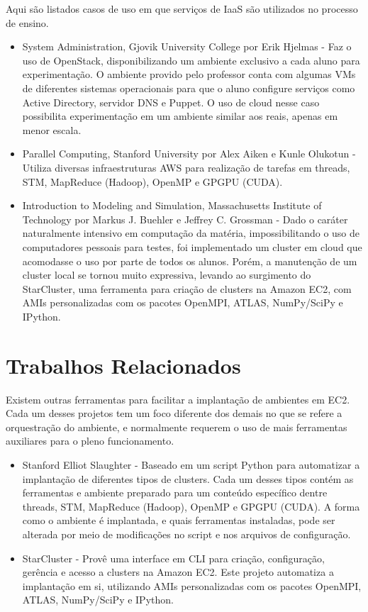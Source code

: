 \documentclass[tg]{mdtufsm}
\begin{document}
Aqui são listados casos de uso em que serviços de IaaS são utilizados no processo de ensino.

\begin{itemize}
\item System Administration, Gjovik University College por Erik Hjelmas \cite{erik} - Faz o uso de OpenStack, disponibilizando um ambiente exclusivo a cada aluno para experimentação. O ambiente provido pelo professor conta com algumas VMs de diferentes sistemas operacionais para que o aluno configure serviços como Active Directory, servidor DNS e Puppet. O uso de cloud nesse caso possibilita experimentação em um ambiente similar aos reais, apenas em menor escala.

\item Parallel Computing, Stanford University por Alex Aiken e Kunle Olukotun \cite{stanford} - Utiliza diversas infraestruturas AWS para realização de tarefas em threads, STM, MapReduce (Hadoop), OpenMP e GPGPU (CUDA).

\item Introduction to Modeling and Simulation, Massachusetts Institute of Technology por Markus J. Buehler e Jeffrey C. Grossman  \cite{starclusterMIT} - Dado o caráter naturalmente intensivo em computação da matéria, impossibilitando o uso de computadores pessoais para testes, foi implementado um cluster em cloud que acomodasse o uso por parte de todos os alunos. Porém, a manutenção de um cluster local se tornou muito expressiva, levando ao surgimento do StarCluster, uma ferramenta para criação de clusters na Amazon EC2, com AMIs personalizadas com os pacotes OpenMPI, ATLAS, NumPy/SciPy e IPython.
\end{itemize}


\section{Trabalhos Relacionados}

Existem outras ferramentas para facilitar a implantação de ambientes em EC2. Cada um desses projetos tem um foco diferente dos demais no que se refere a orquestração do ambiente, e normalmente requerem o uso de mais ferramentas auxiliares para o pleno funcionamento.

\begin{itemize}
	\item Stanford Elliot Slaughter - Baseado em um script Python para automatizar a implantação de diferentes tipos de clusters. Cada um desses tipos contém as ferramentas e ambiente preparado para um conteúdo específico dentre threads, STM, MapReduce (Hadoop), OpenMP e GPGPU (CUDA). A forma como o ambiente é implantada, e quais ferramentas instaladas, pode ser alterada por meio de modificações no script e nos arquivos de configuração.
	
	\item StarCluster \cite{starcluster} - Provê uma interface em CLI para criação, configuração, gerência e acesso a clusters na Amazon EC2. Este projeto automatiza a implantação em si, utilizando AMIs personalizadas com os pacotes OpenMPI, ATLAS, NumPy/SciPy e IPython.
\end{itemize}
\end{document}
